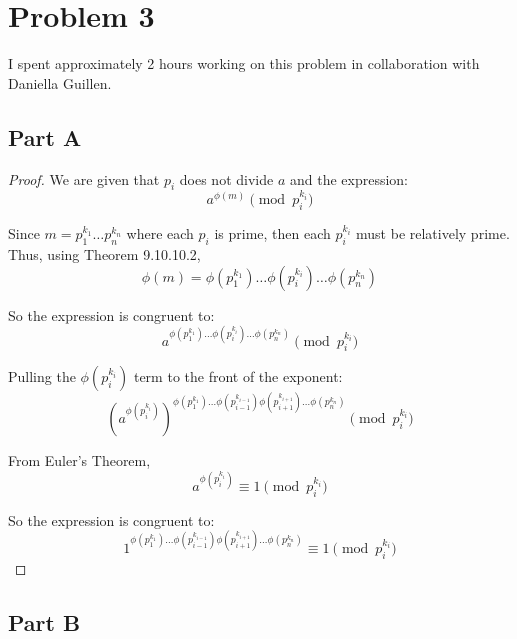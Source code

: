 \documentclass{article}
\begin{document}
\break

\section*{Problem 3}

I spent approximately 2 hours working on this problem in collaboration with
Daniella Guillen.

\subsection*{Part A}

\begin{proof}
We are given that $p_i$ does not divide $a$ and the expression:
$$ a^{\phi(m)} \pmod{p_i^{k_i}} $$

Since $m = p_1^{k_1} \ldots p_n^{k_n}$ where each $p_i$ is prime, then each
$p_i^{k_i}$ must be relatively prime. Thus, using Theorem 9.10.10.2,
$$ \phi(m) = \phi\left(p_1^{k_1}\right) \ldots \phi\left(p_i^{k_i}\right)
\ldots \phi\left(p_n^{k_n}\right) $$

So the expression is congruent to:
$$ a^{\phi\left(p_1^{k_1}\right) \ldots \phi\left(p_i^{k_i}\right) \ldots
\phi\left(p_n^{k_n}\right)} \pmod{p_i^{k_i}} $$

Pulling the $\phi\left(p_i^{k_i}\right)$ term to the front of the exponent:
$$ \left(a^{\phi\left(p_i^{k_i}\right)}
\right)^{\phi\left(p_1^{k_1}\right) \ldots \phi\left(p_{i-1}^{k_{i-1}}\right)
\phi\left(p_{i+1}^{k_{i+1}}\right)\ldots \phi\left(p_n^{k_n}\right)}
\pmod{p_i^{k_i}} $$

From Euler's Theorem,
$$ a^{\phi\left(p_i^{k_i}\right)} \equiv 1 \pmod{p_i^{k_i}} $$

So the expression is congruent to:
$$ 1^{\phi\left(p_1^{k_1}\right) \ldots \phi\left(p_{i-1}^{k_{i-1}}\right)
\phi\left(p_{i+1}^{k_{i+1}}\right)\ldots \phi\left(p_n^{k_n}\right)} \equiv 1
\pmod{p_i^{k_i}} $$
\end{proof}

\break

\subsection*{Part B}
\end{document}
